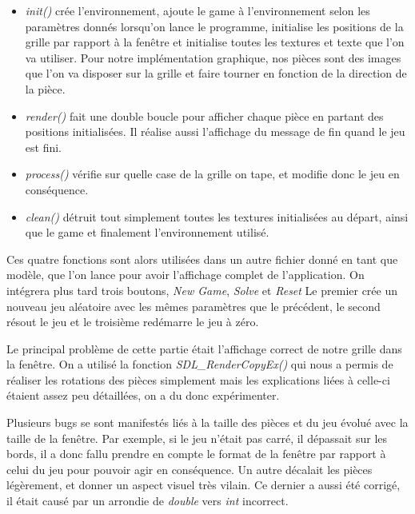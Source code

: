 ﻿\documentclass[12pt]{article}
\begin{document}
\begin{itemize}


\item \emph{init()} crée l’environnement, ajoute le game à l’environnement selon les paramètres donnés lorsqu’on lance le programme, initialise les positions de la grille par rapport à la fenêtre et initialise toutes les textures et texte que l’on va utiliser.
Pour notre implémentation graphique, nos pièces sont des images que l’on va disposer sur la grille et faire tourner en fonction de la direction de la pièce.


\item \emph{render()} fait une double boucle pour afficher chaque pièce en partant des positions initialisées.
Il réalise aussi l’affichage du message de fin quand le jeu est fini.


\item \emph{process()} vérifie sur quelle case de la grille on tape, et modifie donc le jeu en conséquence.


\item \emph{clean()} détruit tout simplement toutes les textures initialisées au départ, ainsi que le game et finalement l’environnement utilisé.


\end{itemize}


Ces quatre fonctions sont alors utilisées dans un autre fichier donné en tant que modèle, que l’on lance pour avoir l’affichage complet de l’application.
On intégrera plus tard trois boutons, \emph{New Game}, \emph{Solve} et \emph{Reset}
Le premier crée un nouveau jeu aléatoire avec les mêmes paramètres que le précédent, le second résout le jeu et le troisième redémarre le jeu à zéro.


Le principal problème de cette partie était l’affichage correct de notre grille dans la fenêtre.
On a utilisé la fonction \emph{SDL\_RenderCopyEx()} qui nous a permis de réaliser les rotations des pièces simplement mais les explications liées à celle-ci étaient assez peu détaillées, on a du donc expérimenter.


Plusieurs bugs se sont manifestés liés à la taille des pièces et du jeu évolué avec la taille de la fenêtre. Par exemple, si le jeu n’était pas carré, il dépassait sur les bords, il a donc fallu prendre en compte le format de la fenêtre par rapport à celui du jeu pour pouvoir agir en conséquence. Un autre décalait les pièces légèrement, et donner un aspect visuel très vilain. Ce dernier a aussi été corrigé, il était causé par un arrondie de \emph{double} vers \emph{int} incorrect.
\end{document}
